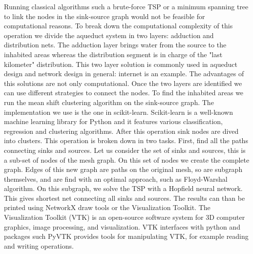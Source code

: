 \noindent Running classical algorithms such a brute-force TSP or a minimum spanning tree to link
the nodes in the sink-source graph would not be feasible for computational reasons. To
break down the computational complexity of this operation we divide the aqueduct system
in two layers: adduction and distribution nets. The adduction layer brings water from the
source to the inhabited areas whereas the distribution segment is in charge of the "last
kilometer" distribution. This two layer solution is commonly used in aqueduct design and
network design in general: internet is an example. The advantages of this solutions are
not only computational. Once the two layers are identified we can use different strategies
to connect the nodes.
To find the inhabited areas we run the mean shift clustering algorithm on the sink-source
graph. The implementation we use is the one in scikit-learn. Scikit-learn is a well-known
machine learning library for Python and it features various classification, regression and
clustering algorithms. After this operation sink nodes are dived into clusters.
This operation is broken down in two tasks. First, find all the paths connecting sinks
and sources. Let us consider the set of sinks and sources, this is a sub-set of nodes of the
mesh graph. On this set of nodes we create the complete graph. Edges of this new graph
are paths on the original mesh, so are subgraph themselves, and are find with an optimal
approach, such as Floyd-Warshal algorithm. On this subgraph, we solve the TSP with a
Hopfield neural network. This gives shortest net connecting all sinks and sources.
The results can than be printed using NetworkX draw tools or the Visualization Toolkit.
The Visualization Toolkit (VTK) is an open-source software system for 3D computer
graphics, image processing, and visualization. VTK interfaces with python and packages
such PyVTK provides tools for manipulating VTK, for example reading and writing
operations.


